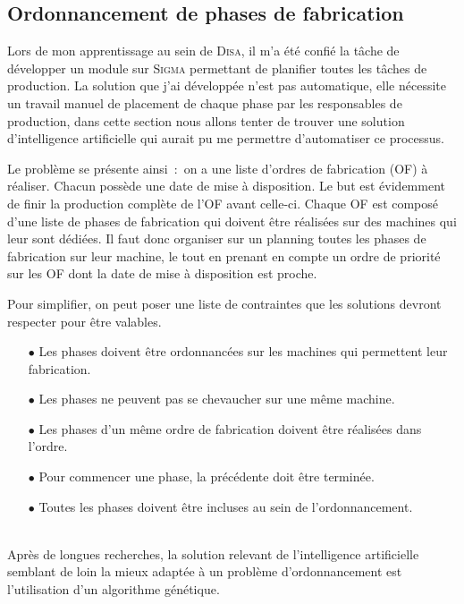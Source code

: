 \subsection{Ordonnancement de phases de fabrication}

Lors de mon apprentissage au sein de \textsc{Disa}, il m'a été confié la tâche de développer un module sur \textsc{Sigma} permettant de planifier toutes les tâches de production.
La solution que j'ai développée n'est pas automatique, elle nécessite un travail manuel de placement de chaque phase par les responsables de production, dans cette section nous allons tenter de trouver une solution d'intelligence artificielle qui aurait pu me permettre d'automatiser ce processus.

Le problème se présente ainsi~:~on a une liste d'ordres de fabrication (OF) à réaliser.
Chacun possède une date de mise à disposition.
Le but est évidemment de finir la production complète de l'OF avant celle-ci.
Chaque OF est composé d'une liste de phases de fabrication qui doivent être réalisées sur des machines qui leur sont dédiées.
Il faut donc organiser sur un planning toutes les phases de fabrication sur leur machine, le tout en prenant en compte un ordre de priorité sur les OF dont la date de mise à disposition est proche.

Pour simplifier, on peut poser une liste de contraintes que les solutions devront respecter pour être valables.
\\
\begin{itemize}
    \item[\tiny$\bullet$] Les phases doivent être ordonnancées sur les machines qui permettent leur fabrication.
    \item[\tiny$\bullet$] Les phases ne peuvent pas se chevaucher sur une même machine.
    \item[\tiny$\bullet$] Les phases d'un même ordre de fabrication doivent être réalisées dans l'ordre.
    \item[\tiny$\bullet$] Pour commencer une phase, la précédente doit être terminée.
    \item[\tiny$\bullet$] Toutes les phases doivent être incluses au sein de l'ordonnancement.
\end{itemize}
~\\

Après de longues recherches, la solution relevant de l'intelligence artificielle semblant de loin la mieux adaptée à un problème d'ordonnancement est l'utilisation d'un algorithme génétique.

